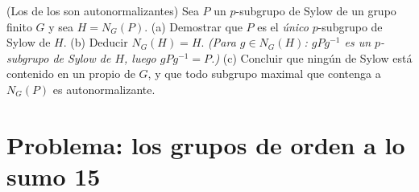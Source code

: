 \begin{exercise}[$\star\star$]\label{exo:b3:groups:12}
(Los  de los
 son autonormalizantes)
Sea $P$ un $p$-subgrupo de Sylow de un grupo finito $G$ y sea $H =
N_G(P)$. (a) Demostrar que $P$ es el \emph{único} $p$-subgrupo de Sylow
de
$H$.
(b) Deducir $N_G(H) = H$. \emph{(Para $g \in N_G(H)$: $gPg^{-1}$ es un
$p$-subgrupo de Sylow de $H$, luego $gPg^{-1} = P$.)} (c) Concluir que
ningún  de Sylow está
contenido en un  propio de
$G$, y que todo subgrupo maximal que contenga a $N_G(P)$ es
autonormalizante.
\end{exercise}

\section{Problema: los grupos de orden a lo sumo 15}

